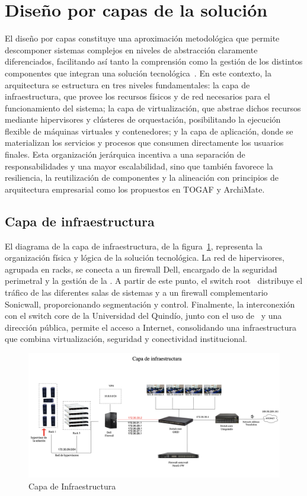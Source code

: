 \section{Diseño por capas de la solución}
\noindent
El diseño por capas constituye una aproximación metodológica que permite descomponer sistemas complejos en niveles de abstracción claramente diferenciados, facilitando así tanto la comprensión como la gestión de los distintos componentes que integran una solución tecnológica~\citep{Spray2023}. En este contexto, la arquitectura se estructura en tres niveles fundamentales: la capa de infraestructura, que provee los recursos físicos y de red necesarios para el funcionamiento del sistema; la capa de virtualización, que abstrae dichos recursos mediante hipervisores y clústeres de orquestación, posibilitando la ejecución flexible de máquinas virtuales y contenedores; y la capa de aplicación, donde se materializan los servicios y procesos que consumen directamente los usuarios finales. Esta organización jerárquica incentiva a una separación de responsabilidades y una mayor escalabilidad, sino que también favorece la resiliencia, la reutilización de componentes y la alineación con principios de arquitectura empresarial como los propuestos en TOGAF y ArchiMate.
\subsection{Capa de infraestructura}
\noindent
El diagrama de la capa de infraestructura, de la figura~\ref{fig:infraestructura}, representa la organización física y lógica de la solución tecnológica. La red de hipervisores, agrupada en racks, se conecta a un firewall Dell, encargado de la seguridad perimetral y la gestión de la \VPN. A partir de este punto, el switch root \GRID\ distribuye el tráfico de las diferentes salas de sistemas y a un firewall complementario Sonicwall, proporcionando segmentación y control. Finalmente, la interconexión con el switch core de la Universidad del Quindío, junto con el uso de \NAT\ y una dirección pública, permite el acceso a Internet, consolidando una infraestructura que combina virtualización, seguridad y conectividad institucional.
\begin{figure}[H]
    \centering
    \includegraphics[scale=0.4]{tablas-images/cp6/disenio-N1.png}
    \caption{Capa de Infraestructura}\label{fig:infraestructura}
\end{figure}

